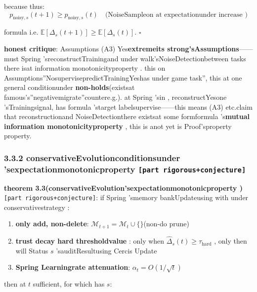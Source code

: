 \documentclass[
  12pt,
]{article}
\providecommand{\tightlist}{%
  \setlength{\itemsep}{0pt}\setlength{\parskip}{0pt}}
\begin{document}
because thus: 
\[p_{\text{noisy},s}(t+1) \geq p_{\text{noisy},s}(t) \quad \text{(NoiseSampleon at expectationunder increase )}\]

formula i.e.
\(\mathbb{E}[\Delta_s(t+1)] \geq \mathbb{E}[\Delta_s(t)]\). \(\square\)

\textbf{honest critique}: Assumptions (A3) Yes\textbf{extremeits strong'sAssumptions}------must  Spring
'sreconstructTrainingand under walk'sNoiseDetectionbetween tasks there isat information monotonicityproperty . this on Assumptions''NosupervisepredictTrainingYeshas under game task'', this at one general conditionunder \textbf{non-holds}(existsat famous's''negativemigrate''countere.g.). at 
Spring
'sin , reconstructYesone 'sTrainingsignal, has formula 'starget labelsupervise------this means  (A3)
etc.claim that reconstructionand NoiseDetectionthere existsat some formformula 's\textbf{mutual information monotonicityproperty }, this is anot yet is Proof'sproperty property. 

\subsubsection{\texorpdfstring{3.3.2 conservativeEvolutionconditionsunder 'sexpectationmonotonicproperty 
\texttt{{[}part rigorous+conjecture{]}}}{3.3.2 conservativeEvolutionconditionsunder 'sexpectationmonotonicproperty  {[}part rigorous+conjecture{]}}}\label{ux4fddux5b88ux8fdbux5316ux6761ux4ef6ux4e0bux7684ux671fux671bux5355ux8c03ux6027-ux90e8ux5206ux4e25ux683cux731cux60f3}

\textbf{theorem  3.3(conservativeEvolution'sexpectationmonotonicproperty )}
\texttt{{[}part rigorous+conjecture{]}}: if  Spring 'smemory bankUpdateusing with under conservativestrategy : 

\begin{enumerate}
\def\labelenumi{\arabic{enumi}.}
\tightlist
\item
  \textbf{only add, non-delete}: \(\mathcal{M}_{t+1} = \mathcal{M}_t \cup \{\text{}\}\)(non-do prune)
\item
  \textbf{trust decay hard thresholdvalue }: only when 
  \(\hat{\Delta}_s(t) \geq \tau_{\text{hard}}\) , only then will Status \(s\)
  'sauditResultusing  Cercis Update
\item
  \textbf{Spring Learningrate attenuation}: \(\alpha_t = O(1/\sqrt{t})\)
\end{enumerate}

then at  \(t\) sufficient, for which has  \(s\): 
\end{document}

